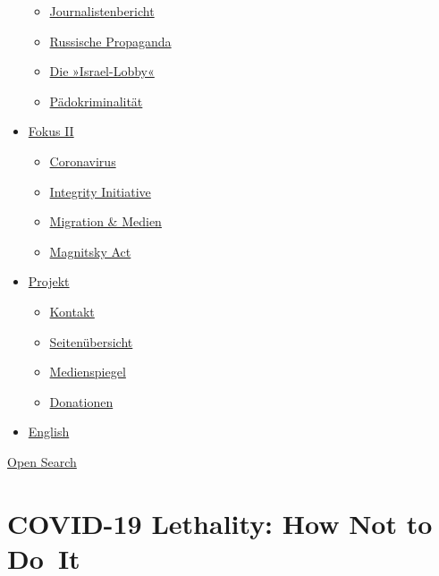 \begin{itemize}
  \begin{itemize}
  \tightlist
  \item
    \href{https://swprs.org/bericht-eines-journalisten/}{Journalistenbericht}
  \item
    \href{https://swprs.org/russische-propaganda/}{Russische Propaganda}
  \item
    \href{https://swprs.org/die-israel-lobby-fakten-und-mythen/}{Die
    »Israel-Lobby«}
  \item
    \href{https://swprs.org/geopolitik-und-paedokriminalitaet/}{Pädokriminalität}
  \end{itemize}
\item
  \href{https://swprs.org/migration-und-medien/}{Fokus II}

  \begin{itemize}
  \tightlist
  \item
    \href{https://swprs.org/covid-19-hinweis-ii/}{Coronavirus}
  \item
    \href{https://swprs.org/die-integrity-initiative/}{Integrity
    Initiative}
  \item
    \href{https://swprs.org/migration-und-medien/}{Migration \& Medien}
  \item
    \href{https://swprs.org/der-fall-magnitsky/}{Magnitsky Act}
  \end{itemize}
\item
  \href{https://swprs.org/kontakt/}{Projekt}

  \begin{itemize}
  \tightlist
  \item
    \href{https://swprs.org/kontakt/}{Kontakt}
  \item
    \href{https://swprs.org/uebersicht/}{Seitenübersicht}
  \item
    \href{https://swprs.org/medienspiegel/}{Medienspiegel}
  \item
    \href{https://swprs.org/donationen/}{Donationen}
  \end{itemize}
\item
  \href{https://swprs.org/contact/}{English}
\end{itemize}

\protect\hyperlink{}{Open Search}

\hypertarget{covid-19-lethality-how-not-to-do-it}{%
\section{COVID-19 Lethality: How Not to
Do~It}\label{covid-19-lethality-how-not-to-do-it}}

